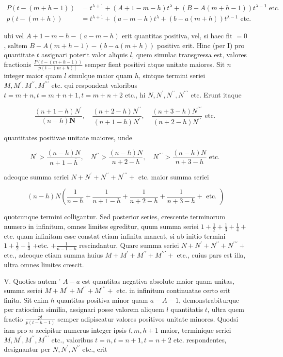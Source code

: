 \documentclass[10pt]{article}
\begin{document}
\[
\begin{aligned}
P(t-(m+h-1)) & =t^{\lambda+1}+(A+1-m-h) t^{\lambda}+(B-A(m+h-1)) t^{\lambda-1} \text { etc. } \\
p(t-(m+h)) & =t^{\lambda+1}+(a-m-h) t^{\lambda}+(b-a(m+h)) t^{\lambda-1} \text { etc. }
\end{aligned}
\]

ubi vel \(A+1-m-h-(a-m-h)\) erit quantitas positiva, vel, si haec fit \(=0\), saltem \(B-A(m+h-1)-(b-a(m+h))\) positiva erit. Hinc (per I) pro quantitate \(t\) assignari poterit valor aliquis \(l\), quem simulac transgressa est, valores fractionis \(\frac{P(t-(m+h-1))}{p(t-(m+h))}\) semper fient positivi atque unitate maiores. Sit \(n\) integer
maior quam \(l\) simulque maior quam \(h\), sintque termini seriei \(M, M^{\prime}, M^{\prime \prime}, M^{\prime \prime \prime}\) etc. qui respondent valoribus \(t=m+n, t=m+n+1, t=m+n+2\) etc., hi \(N, N^{\prime}, N^{\prime \prime}, N^{\prime \prime \prime}\) etc. Erunt itaque

\[
\frac{(n+1-h) N^{\prime}}{(n-h) \boldsymbol{N}}, \quad \frac{(n+2-h) N^{\prime \prime}}{(n+1-h) N^{\prime}}, \quad \frac{(n+3-h) N^{\prime \prime \prime}}{(n+2-h) N^{\prime \prime}} \text { etc. }
\]

quantitates positivae unitate maiores, unde

\[
N^{\prime}>\frac{(n-h) N}{n+1-\bar{h}}, \quad N^{\prime \prime}>\frac{(n-h) N}{n+2-h}, \quad N^{\prime \prime \prime}>\frac{(n-h) N}{n+3-h} \text { etc. }
\]

adeoque summa seriei \(N+N^{\prime}+N^{\prime \prime}+N^{\prime \prime \prime}+\) etc. maior summa seriei

\[
(n-h) N\left(\frac{1}{n-h}+\frac{1}{n+1-h}+\frac{1}{n+2-h}+\frac{1}{n+3-h}+\text { etc. }\right)
\]

quotcunque termini colligantur. Sed posterior series, crescente terminorum numero in infinitum, omnes limites egreditur, quum summa seriei \(1+\frac{1}{2}+\frac{1}{3}+\frac{1}{4}+\) etc. quam infinitam esse constat etiam infinita maneat, si ab initio termini \(1+\frac{1}{2}+\frac{1}{3}\) +etc. \(+\frac{1}{n-1-h}\) rescindantur. Quare summa seriei \(N+N^{\prime}+N^{\prime \prime}+N^{\prime \prime \prime}+\) etc., adeoque etiam summa huius \(M+M^{\prime}+M^{\prime \prime}+M^{\prime \prime \prime}+\) etc., cuius pars est illa, ultra omnes limites crescit.

V. Quoties autem ' \(A-a\) est quantitas negativa absolute maior quam unitas, summa seriei \(M+M^{\prime}+M^{\prime \prime}+M^{\prime \prime \prime}+\) etc. in infinitum continuatae certo erit finita. Sit enim \(h\) quantitas positiva minor quam \(a-A-1\), demonstrabiturque per ratiocinia similia, assignari posse valorem aliquem \(l\) quantitatis \(t\), ultra quem fractio \(\frac{p t}{p(t-h-1)}\) semper adipiscatur valores positivos unitate minores. Quodsi iam pro \(n\) accipitur numerus integer ipsis \(l, m, h+1\) maior, terminique seriei \(M, M^{\prime}, M^{\prime \prime}, M^{\prime \prime \prime}\) etc., valoribus \(t=n, t=n+1, t=n+2\) etc. respondentes, designantur per \(N, N^{\prime}, N^{\prime \prime}\) etc., erit
\end{document}
